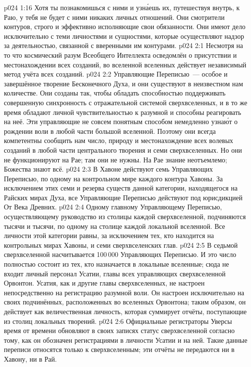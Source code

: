 \vs p024 1:16 Хотя ты познакомишься с ними и узн\'аешь их, путешествуя внутрь, к Раю, у тебя не будет с ними никаких личных отношений. Они смотрители контуров, строго и эффективно исполняющие свои обязанности. Они имеют дело исключительно с теми личностями и сущностями, которые осуществляют надзор за деятельностью, связанной с вверенными им контурами.
\vs p024 2:1 Несмотря на то что космический разум Всеобщего Интеллекта осведомлён о присутствии и местонахождении всех  созданий, во вселенной вселенных действует независимый метод учёта всех  созданий.
\vs p024 2:2 Управляющие Переписью~--- особое и завершённое творение Бесконечного Духа, и они существуют в неизвестном нам количестве. Они созданы так, чтобы обладать способностью поддерживать совершенную синхронность с отражательной системой сверхвселенных, и в то же время обладают личной чувствительностью к разумной  и способны реагировать на неё. Эти управляющие не совсем понятным способом немедленно узна\'ют о рождении воли в любой части большой вселенной. Поэтому они всегда компетентны сообщить нам число, природу и местонахождение всех волевых созданий в любой части центрального творения и семи сверхвселенных. Но они не функционируют на Рае; там они не нужны. На Рае знание неотъемлемо; Божества знают всё.
\vs p024 2:3 \pc В Хавоне действуют семь Управляющих Переписью, по одному на контрольном мире каждого контура Хавоны. За исключением этих семи и резерва существ данной категории, находящегося на Райских мирах Духа, все Управляющие Переписью действуют под юрисдикцией От Века Древних.
\vs p024 2:4 Одному главному Управляющему Переписью, осуществляющему руководство из столицы каждой сверхвселенной, подчиняются тысячи и тысячи, по одному на столице каждой локальной вселенной. Все личности этой категории равны, за исключением тех, кто находится на контрольных мирах Хавоны, и семи сверхвселенских глав.
\vs p024 2:5 В седьмой сверхвселенной насчитывается 100\,000 Управляющих Переписью. И это число полностью состоит из тех, кто назначается в локальные вселенные; сюда не входит личный персонал Усатии, главы всех управляющих сверхвселенной Орвонтон. Усатия, как и другие главы сверхвселенных, не настроен непосредственно на регистрацию разумной воли. Он настроен исключительно на своих подчинённых, расположенных во вселенных Орвонтона; таким образом, он действует как величественная личность, которая суммирует отчёты, поступающие из столиц локальных творений.
\vs p024 2:6 Официальные регистраторы Уверсы время от времени обновляют в своих записях статус сверхвселенной согласно тому, как он обозначен регистрациями в личности Усатии и на ней. Такие данные переписи относятся только к сверхвселенным; эти отчёты не передаются ни в Хавону, ни в Рай.
